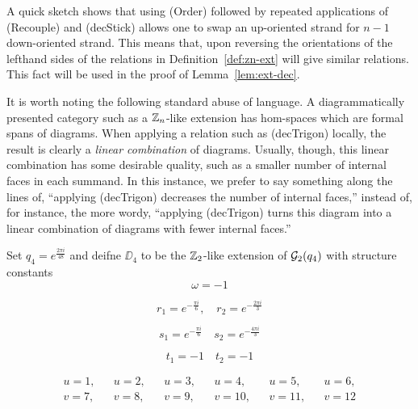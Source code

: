 \begin{remark}
    A quick sketch shows that using (Order) followed by repeated applications of (Recouple) and (decStick) 
    allows one to swap an up-oriented strand for $n-1$ down-oriented strand. 
    This means that, upon reversing the orientations of the lefthand sides of the relations in 
    Definition~\ref{def:zn-ext} will give similar relations.
    This fact will be used in the proof of Lemma~\ref{lem:ext-dec}.
\end{remark}


\begin{remark}
    It is worth noting the following standard abuse of language. 
    A diagrammatically presented category such as a $\mathbb{Z}_n$-like extension has hom-spaces which are formal spans of diagrams.
    When applying a relation such as (decTrigon) locally, the result is clearly a {\it linear combination} of diagrams.
    Usually, though, this linear combination has some desirable quality, such as a smaller number of internal faces in each summand.
    In this instance, we prefer to say something along the lines of, 
    ``applying (decTrigon) decreases the number of internal faces,''
    instead of, for instance, the more wordy,
    ``applying (decTrigon) turns this diagram into a linear combination of diagrams with fewer internal faces.''
\end{remark}



\begin{definition}
    Set $q_4 = e^{\frac{2\pi i}{48}}$ and deifne $\DD_4$ to be the $\mathbb{Z}_2$-like extension of $\mathcal{G}_2(q_4)$ with structure constants
    \begin{equation*}
    \omega = -1
    \end{equation*}

    \begin{equation*}
        r_1 = e^{-\frac{\pi i}{6}}, \quad r_2 = e^{-\frac{2\pi i}{3}}
    \end{equation*}

    \begin{equation*}
        s_1 = e^{-\frac{\pi i}{6}} \quad s_2 = e^{-\frac{4\pi i}{3}}
    \end{equation*}

    \begin{equation*}
        t_1 = -1 \quad t_2 = -1
    \end{equation*}

    \begin{align*}
        u = 1, && u = 2, && u = 3, && u = 4, && u = 5, && u = 6, \\
        v = 7, && v = 8, && v = 9, && v = 10, && v = 11, && v = 12 
    \end{align*}


\end{definition}



